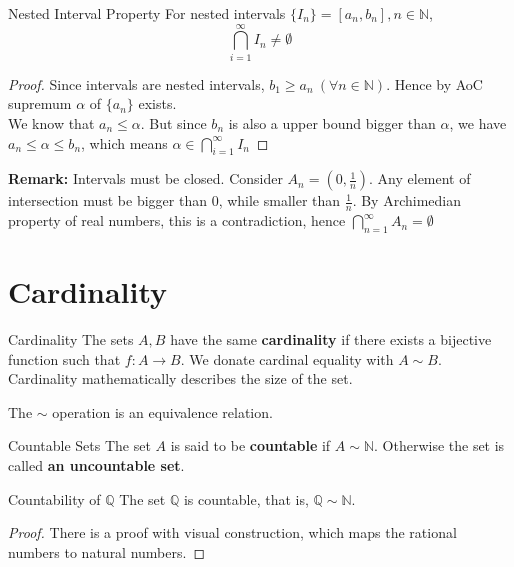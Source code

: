\begin{theo}{Nested Interval Property}{}
    For nested intervals $\{ I_n\} = [a_n, b_n],n \in \mathbb{N}$,
    \[ \bigcap_{i=1}^{\infty}I_n \neq \emptyset \]
    \tcblower
    \begin{proof}
        Since intervals are nested intervals, $b_1 \ge a_n \ (\forall n \in \mathbb{N})$. Hence by AoC supremum $\alpha$ of $\{ a_n\}$ exists.
        \\
        We know that $a_n \le \alpha$. But since $b_n$ is also a upper bound
        bigger than $\alpha$, we have $a_n \le \alpha \le b_n$, which means $\alpha \in
        \bigcap_{i=1}^{\infty}I_n$
    \end{proof}
    \textbf{Remark:} Intervals must be closed. Consider $A_n = (0,
    \frac{1}{n})$. Any element of intersection must be bigger than $0$,
    while smaller than $\frac{1}{n}$. By Archimedian property of real
    numbers, this is a contradiction, hence $\bigcap_{n=1}^{\infty}A_n
    = \emptyset$
\end{theo}

\section{Cardinality}

\begin{defi}{Cardinality}{}
    The sets $A,B$ have the same \textbf{cardinality} if there exists a
    bijective function such that $f: A \rightarrow B$. We donate
    cardinal equality with $A \sim B$. \\
    Cardinality mathematically describes the size of the set.

    The $\sim$ operation is an equivalence relation.
\end{defi}

\begin{defi}{Countable Sets}{}
    The set $A$ is said to be \textbf{countable} if $A \sim \mathbb{N}$. Otherwise the set is
    called \textbf{an uncountable set}.
\end{defi}

\begin{theo}{Countability of $\mathbb{Q}$}{}
    The set $\mathbb{Q}$ is countable, that is, $\mathbb{Q} \sim \mathbb{N}$.
    \begin{proof}
        There is a proof with visual construction, which maps the
        rational numbers to natural numbers.
    \end{proof}
\end{theo}

